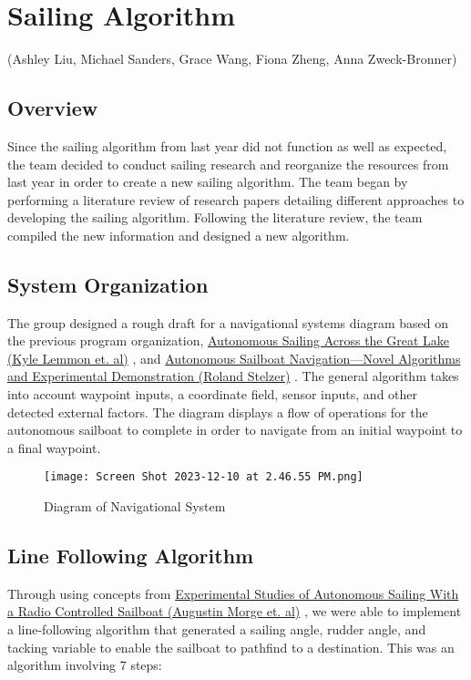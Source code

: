 \documentclass{article}
\begin{document}
\section{Sailing Algorithm}
(Ashley Liu, Michael Sanders, Grace Wang, Fiona Zheng, Anna Zweck-Bronner)
\subsection{Overview}
Since the sailing algorithm from last year did not function as well as expected, the team decided to conduct sailing research and reorganize the resources from last year in order to create a new sailing algorithm. The team began by performing a literature review of research papers detailing different approaches to developing the sailing algorithm. Following the literature review, the team compiled the new information and designed a new algorithm.  
\subsection{System Organization}
The group designed a rough draft for a navigational systems diagram based on the previous program organization, \href{https://my.ece.utah.edu/~kstevens/4710/reports/autonomous-sailing.pdf}{Autonomous Sailing Across the Great Lake (Kyle Lemmon et. al)} \cite{utah}, and \href{https://core.ac.uk/download/pdf/228200594.pdf}{Autonomous Sailboat Navigation—Novel Algorithms and Experimental Demonstration (Roland Stelzer)} \cite{uk}. The general algorithm takes into account waypoint inputs, a coordinate field, sensor inputs, and other detected external factors. The diagram displays a flow of operations for the autonomous sailboat to complete in order to navigate from an initial waypoint to a final waypoint.
\begin{figure}[h]
    \centering
    \texttt{[image: Screen Shot 2023-12-10 at 2.46.55 PM.png]}
    \caption{Diagram of Navigational System}
    \label{fig:enter-label}
\end{figure}
\subsection{Line Following Algorithm}
Through using concepts from \href{https://ieeexplore.ieee.org/document/9999358}{Experimental Studies of Autonomous Sailing With a Radio Controlled Sailboat (Augustin Morge et. al)}  \cite{rcsailboatieee}, we were able to implement a line-following algorithm that generated a sailing angle, rudder angle, and tacking variable to enable the sailboat to pathfind to a destination. This was an algorithm involving 7 steps:
\end{document}
